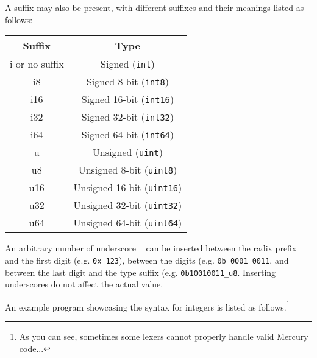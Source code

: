 A suffix may also be present, with different suffixes and their meanings listed as follows:
\begin{center}
  \begin{tabular}{|c|c|}
    \hline
    Suffix & Type \\
    \hline
i or no suffix & Signed (\texttt{int})  \\
i8 & Signed 8-bit (\texttt{int8})  \\
i16 & Signed 16-bit (\texttt{int16})  \\
i32 & Signed 32-bit (\texttt{int32})  \\
i64 & Signed 64-bit (\texttt{int64})  \\
u & Unsigned (\texttt{uint}) \\
u8 & Unsigned 8-bit (\texttt{uint8}) \\
u16 & Unsigned 16-bit (\texttt{uint16}) \\
u32 & Unsigned 32-bit (\texttt{uint32}) \\
u64 & Unsigned 64-bit (\texttt{uint64}) \\
\hline
  \end{tabular}
  \end{center}

  An arbitrary number of underscore \texttt{\_} can be inserted between the radix prefix and the first digit (e.g. \texttt{0x\_123}), between the digits (e.g. \texttt{0b\_0001\_0011}, and between the last digit and the type suffix (e.g. \texttt{0b10010011\_u8}. Inserting underscores do not affect the actual value.

  An example program showcasing the syntax for integers is listed as follows.\footnote{As you can see, sometimes some lexers cannot properly handle valid Mercury code...}


